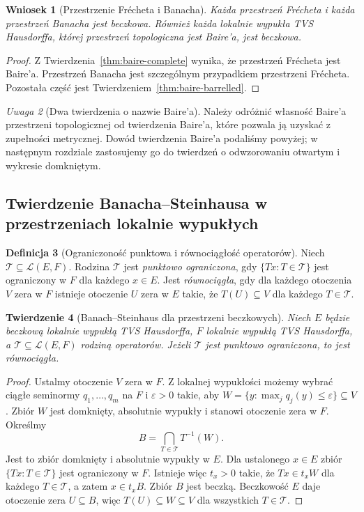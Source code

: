 \documentclass[11pt,a4paper]{article}
\numberwithin{equation}{section}
\theoremstyle{plain}
\newtheorem{twierdzenie}{Twierdzenie}[section]
\newtheorem{wniosek}[twierdzenie]{Wniosek}
\theoremstyle{definition}
\newtheorem{definicja}[twierdzenie]{Definicja}
\theoremstyle{remark}
\newtheorem{uwaga}[twierdzenie]{Uwaga}
\begin{document}
\begin{wniosek}[Przestrzenie Frécheta i Banacha]\label{cor:frechet-barrelled}
Każda przestrzeń Frécheta i każda przestrzeń Banacha
jest beczkowa. Również każda lokalnie wypukła TVS
Hausdorffa, której przestrzeń topologiczna jest Baire'a,
jest beczkowa.
\end{wniosek}
\begin{proof}
Z Twierdzenia~\ref{thm:baire-complete} wynika, że
przestrzeń Frécheta jest Baire'a.
Przestrzeń Banacha jest szczególnym przypadkiem przestrzeni
Frécheta. Pozostała część jest
Twierdzeniem~\ref{thm:baire-barrelled}.
\end{proof}

\begin{uwaga}[Dwa twierdzenia o nazwie Baire'a]
Należy odróżnić własność Baire'a przestrzeni topologicznej
od twierdzenia Baire'a, które pozwala ją uzyskać z
zupełności metrycznej. Dowód twierdzenia Baire'a podaliśmy powyżej;
w następnym rozdziale zastosujemy go do twierdzeń
o odwzorowaniu otwartym i wykresie domkniętym.
\end{uwaga}

\subsection{Twierdzenie Banacha--Steinhausa w przestrzeniach lokalnie wypukłych}

\begin{definicja}[Ograniczoność punktowa i równociągłość operatorów]
Niech $\mathcal T\subseteq\mathcal L(E,F)$.
Rodzina $\mathcal T$ jest \emph{punktowo ograniczona}, gdy
$\{Tx:T\in\mathcal T\}$ jest ograniczony w $F$ dla każdego
$x\in E$. Jest \emph{równociągła}, gdy dla każdego otoczenia
$V$ zera w $F$ istnieje otoczenie $U$ zera w $E$
takie, że $T(U)\subseteq V$ dla każdego $T\in\mathcal T$.
\end{definicja}

\begin{twierdzenie}[Banach--Steinhaus dla przestrzeni beczkowych]
\label{thm:banach-steinhaus-lcs}
Niech $E$ będzie beczkową lokalnie wypukłą TVS Hausdorffa,
$F$ lokalnie wypukłą TVS Hausdorffa, a
$\mathcal T\subseteq\mathcal L(E,F)$ rodziną operatorów.
Jeżeli $\mathcal T$ jest punktowo ograniczona, to jest
równociągła.
\end{twierdzenie}
\begin{proof}
Ustalmy otoczenie $V$ zera w $F$. Z lokalnej wypukłości
możemy wybrać ciągłe seminormy $q_1,\ldots,q_m$ na $F$
i $\varepsilon>0$ takie, aby
$W=\{y:\max_jq_j(y)\le\varepsilon\}\subseteq V$.
Zbiór $W$ jest domknięty, absolutnie wypukły i stanowi
otoczenie zera w $F$. Określmy
\[
 B=\bigcap_{T\in\mathcal T}T^{-1}(W).
\]
Jest to zbiór domknięty i absolutnie wypukły w $E$.
Dla ustalonego $x\in E$ zbiór $\{Tx:T\in\mathcal T\}$
jest ograniczony w $F$. Istnieje więc $t_x>0$ takie,
że $Tx\in t_x W$ dla każdego $T\in\mathcal T$,
a zatem $x\in t_xB$. Zbiór $B$ jest beczką.
Beczkowość $E$ daje otoczenie zera $U\subseteq B$,
więc $T(U)\subseteq W\subseteq V$ dla wszystkich
$T\in\mathcal T$.
\end{proof}
\end{document}
